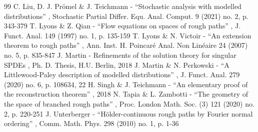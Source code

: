 \documentclass[11pt]{article}
\numberwithin{equation}{section}
\theoremstyle{plain}
\theoremstyle{definition}
\begin{document}
\begin{thebibliography}{99}
 C. Liu, D. J. Prömel \& J. Teichmann - “Stochastic analysis with modelled distributions” , Stochastic Partial Differ. Equ. Anal. Comput. 9 (2021) no. 2, p. 343-379
 T. Lyons \& Z. Qian - “Flow equations on spaces of rough paths” , J. Funct. Anal. 149 (1997) no. 1, p. 135-159
 T. Lyons \& N. Victoir - “An extension theorem to rough paths” , Ann. Inst. H. Poincaré Anal. Non Linéaire 24 (2007) no. 5, p. 835-847
 J. Martin - Refinements of the solution theory for singular SPDEs , Ph. D. Thesis, H.U. Berlin, 2018
 J. Martin \& N. Perkowski - “A Littlewood-Paley description of modelled distributions” , J. Funct. Anal. 279 (2020) no. 6, p. 108634, 22
 H. Singh \& J. Teichmann - “An elementary proof of the reconstruction theorem” , 2018
 N. Tapia \& L. Zambotti - “The geometry of the space of branched rough paths” , Proc. London Math. Soc. (3) 121 (2020) no. 2, p. 220-251
 J. Unterberger - “Hölder-continuous rough paths by Fourier normal ordering” , Comm. Math. Phys. 298 (2010) no. 1, p. 1-36
\end{thebibliography}
\end{document}
